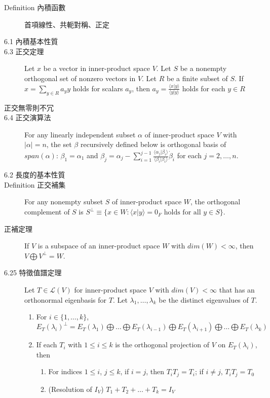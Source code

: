 \documentclass[9pt, twocolumn]{extarticle}
\begin{document}
\begin{description}
\begin{enumerate*}[label=(\alph*),itemjoin={;\quad}]
        \end{enumerate*}
    \item[Definition 內積函數] 首項線性、共軛對稱、正定
    \item[6.1 內積基本性質]
    \item[6.3 正交定理] Let $x$ be a vector in inner-product space $V$. Let $S$ be a nonempty orthogonal set of nonzero vectors in $V$. Let $R$ be a finite subset of $S$. If $x = \sum_{y \in R} a_y y$ holds for scalars $a_y$, then $a_y = \frac{\langle x | y \rangle}{\langle y | y \rangle}$ holds for each $y \in R$
    \item[正交無零則不冗]
    \item[6.4 正交演算法] For any linearly independent subset $\alpha$ of inner-product space $V$ with $|\alpha| = n$, the set $\beta$ recursively defined below is orthogonal basis of $span(\alpha)$: $\beta_1 = \alpha_1$ and $\beta_j = \alpha_j - \sum_{i=1}^{j-1} \frac{\langle \alpha_j | \beta_i \rangle}{\langle \beta_i | \beta_i \rangle} \dot \beta_i$ for each $j = 2, \dots, n$.
    \item[6.2 長度的基本性質]
    \item[Definition 正交補集] For any nonempty subset $S$ of inner-product space $W$, the orthogonal complement of $S$ is $S^\perp \equiv \{ x \in W: \langle x | y \rangle = 0_F \text{ holds for all } y \in S \}$.
    \item[正補定理] If $V$ is a subspace of an inner-product space $W$ with $dim(W) < \infty$, then $V \bigoplus V^\perp = W$.
    \item[6.25 特徵值譜定理] Let $T \in \mathcal{L}(V)$ for inner-product space $V$ with $dim(V) < \infty$ that has an orthonormal eigenbasis for $T$. Let $\lambda_1, \dots, \lambda_k$ be the distinct eigenvalues of $T$.
        \begin{enumerate}
            \item For $i \in \{ 1, \dots, k \}$, $E_T(\lambda_i)^\perp = E_T(\lambda_1) \bigoplus \dots \bigoplus E_T(\lambda_{i-1}) \bigoplus E_T(\lambda_{i+1}) \bigoplus \dots \bigoplus E_T(\lambda_k)$
            \item If each $T_i$ with $1 \leq i \leq k$ is the orthogonal projection of $V$ on $E_T(\lambda_i)$, then
                \begin{enumerate}
                    \item For indices $1 \leq i$, $j \leq k$, if $i = j$, then $T_i T_j = T_i$; if $i \neq j$, $T_i T_j = T_0$
                    \item (Resolution of $I_V$) $T_1 + T_2 + \dots + T_k = I_V$

\end{enumerate}
\end{enumerate}
\end{description}
\end{document}
